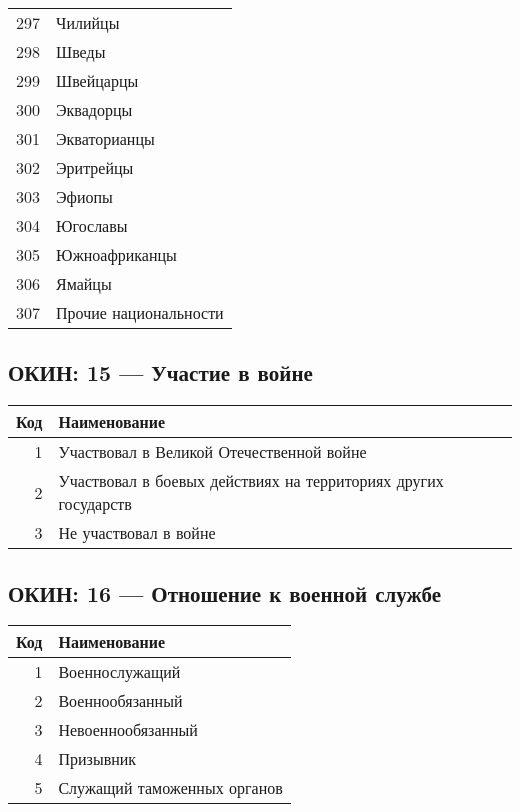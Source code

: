 \documentclass[10pt, a4paper, titlepage]{article}
\begin{document}
\begin{xtabular}{rp{.38\textwidth}}
    297 & Чилийцы \\
    298 & Шведы \\
    299 & Швейцарцы \\
    300 & Эквадорцы \\
    301 & Экваторианцы \\
    302 & Эритрейцы \\
    303 & Эфиопы \\
    304 & Югославы \\
    305 & Южноафриканцы \\
    306 & Ямайцы \\
    307 & Прочие национальности \\
\end{xtabular}
\onecolumn

\subsection{ОКИН: 15 --- Участие в войне}

\begin{center}
    \begin{tabular}{rp{}}
        \hline
        \textbf{Код} & \textbf{Наименование} \\ \hline
        1 & Участвовал в Великой Отечественной войне \\
        2 & Участвовал в боевых действиях на территориях других государств \\
        3 & Не участвовал в войне \\
    \end{tabular}
\end{center}

\subsection{ОКИН: 16 --- Отношение к военной службе}

\begin{center}
    \begin{tabular}{rp{}}
        \hline
        \textbf{Код} & \textbf{Наименование} \\ \hline
        1 & Военнослужащий \\
        2 & Военнообязанный \\
        3 & Невоеннообязанный \\
        4 & Призывник \\
        5 & Служащий таможенных органов \\
    \end{tabular}
\end{center}
\end{document}
